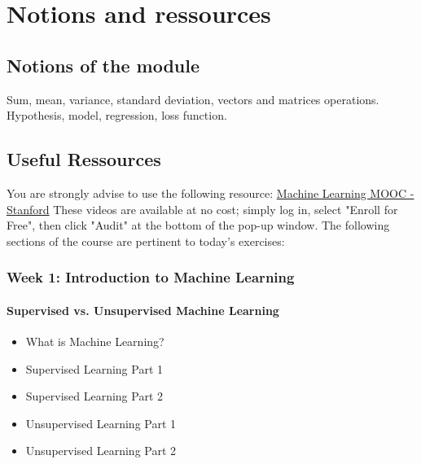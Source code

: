 

\chapter*{Notions and ressources}

\section*{Notions of the module}
Sum, mean, variance, standard deviation, vectors and matrices operations.  
Hypothesis, model, regression, loss function. 

\section*{Useful Ressources}

You are strongly advise to use the following resource:
\href{https://www.coursera.org/learn/machine-learning}{Machine Learning MOOC - Stanford}
These videos are available at no cost; simply log in, select "Enroll for Free", then click "Audit" at the bottom of the pop-up window.
The following sections of the course are pertinent to today's exercises: 

\newpage

\subsection*{Week 1: Introduction to Machine Learning}

\subsubsection*{Supervised vs. Unsupervised Machine Learning}
\begin{itemize}
  \item What is Machine Learning?
  \item Supervised Learning Part 1
  \item Supervised Learning Part 2
  \item Unsupervised Learning Part 1
  \item Unsupervised Learning Part 2
\end{itemize}
    
